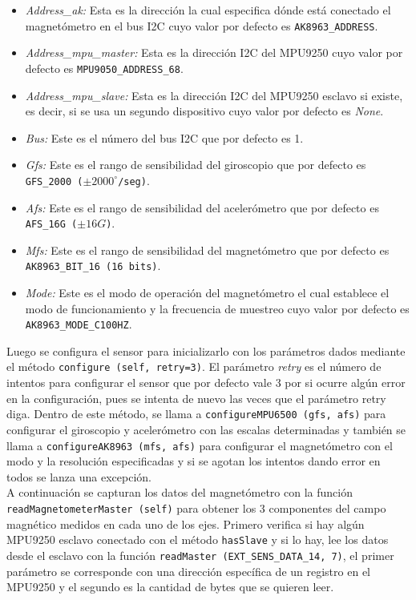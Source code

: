 \begin{itemize}
 \item \textit{Address\_ak:} Esta es la dirección la cual especifica dónde está conectado el magnetómetro en el bus I2C cuyo valor por defecto es \texttt{AK8963\_ADDRESS}.
 \item \textit{Address\_mpu\_master:} Esta es la dirección I2C del MPU9250 cuyo valor por defecto es \texttt{MPU9050\_ADDRESS\_68}.
 \item \textit{Address\_mpu\_slave:} Esta es la dirección I2C del MPU9250 esclavo si existe, es decir, si se usa un segundo dispositivo cuyo valor por defecto es \textit{None}.
 \item \textit{Bus:} Este es el número del bus I2C que por defecto es 1.
 \item \textit{Gfs:} Este es el rango de sensibilidad del giroscopio que por defecto es \texttt{GFS\_2000 ($\pm 2000^\circ$/seg)}.
 \item \textit{Afs:} Este es el rango de sensibilidad del acelerómetro que por defecto es \texttt{AFS\_16G ($\pm 16G$)}.
 \item \textit{Mfs:} Este es el rango de sensibilidad del magnetómetro que por defecto es \texttt{AK8963\_BIT\_16 (16 bits)}.
 \item \textit{Mode:} Este es el modo de operación del magnetómetro el cual establece el modo de funcionamiento y la frecuencia de muestreo cuyo valor por defecto es \texttt{AK8963\_MODE\_C100HZ}.
\end{itemize}


Luego se configura el sensor para inicializarlo con los parámetros dados mediante el método \verb|configure (self, retry=3)|. El parámetro \textit{retry} es el número de intentos para configurar el sensor que por defecto vale 3 por si ocurre algún error en la configuración, pues se intenta de nuevo las veces que el parámetro retry diga. Dentro de este método, se llama a \verb|configureMPU6500 (gfs, afs)| para configurar el giroscopio y acelerómetro con las escalas determinadas y también se llama a \verb|configureAK8963 (mfs, afs)| para configurar el magnetómetro con el modo y la resolución especificadas y si se agotan los intentos dando error en todos se lanza una excepción.\\


A continuación se capturan los datos del magnetómetro con la función \verb|readMagnetometerMaster (self)| para obtener los 3 componentes del campo magnético medidos en cada uno de los ejes. Primero verifica si hay algún MPU9250 esclavo conectado con el método \verb|hasSlave| y si lo hay, lee los datos desde el esclavo con la función \verb|readMaster (EXT_SENS_DATA_14, 7)|, el primer parámetro se corresponde con una dirección específica de un registro en el MPU9250 y el segundo es la cantidad de bytes que se quieren leer.\\

